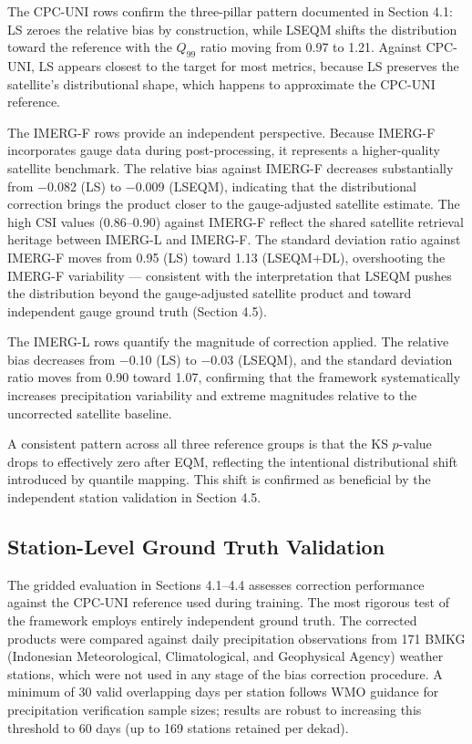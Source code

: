 \documentclass[remotesensing,article,submit,pdftex,moreauthors]{Definitions/mdpi}
\begin{document}
The CPC-UNI rows confirm the three-pillar pattern documented in Section
4.1: LS zeroes the relative bias by construction, while LSEQM shifts the
distribution toward the reference with the \(Q_{99}\) ratio moving from
0.97 to 1.21. Against CPC-UNI, LS appears closest to the target for most
metrics, because LS preserves the satellite's distributional shape,
which happens to approximate the CPC-UNI reference.

The IMERG-F rows provide an independent perspective. Because IMERG-F
incorporates gauge data during post-processing, it represents a
higher-quality satellite benchmark. The relative bias against IMERG-F
decreases substantially from $-$0.082 (LS) to $-$0.009 (LSEQM),
indicating that the distributional correction brings the product closer
to the gauge-adjusted satellite estimate. The high CSI values
(0.86--0.90) against IMERG-F reflect the shared satellite retrieval
heritage between IMERG-L and IMERG-F. The standard deviation ratio
against IMERG-F moves from 0.95 (LS) toward 1.13 (LSEQM+DL),
overshooting the IMERG-F variability --- consistent with the
interpretation that LSEQM pushes the distribution beyond the
gauge-adjusted satellite product and toward independent gauge ground
truth (Section 4.5).

The IMERG-L rows quantify the magnitude of correction applied. The
relative bias decreases from $-$0.10 (LS) to $-$0.03 (LSEQM), and
the standard deviation ratio moves from 0.90 toward 1.07, confirming
that the framework systematically increases precipitation variability
and extreme magnitudes relative to the uncorrected satellite baseline.

A consistent pattern across all three reference groups is that the KS
\(p\)-value drops to effectively zero after EQM, reflecting the
intentional distributional shift introduced by quantile mapping. This
shift is confirmed as beneficial by the independent station validation
in Section 4.5.

\subsection{Station-Level Ground Truth
Validation}\label{station-level-ground-truth-validation}

The gridded evaluation in Sections 4.1--4.4 assesses correction
performance against the CPC-UNI reference used during training. The most
rigorous test of the framework employs entirely independent ground
truth. The corrected products were compared against daily precipitation
observations from 171 BMKG (Indonesian Meteorological, Climatological,
and Geophysical Agency) weather stations, which were not used in any
stage of the bias correction procedure. A minimum of 30 valid
overlapping days per station follows WMO guidance for precipitation
verification sample sizes; results are robust to increasing this
threshold to 60 days (up to 169 stations retained per dekad).
\end{document}
